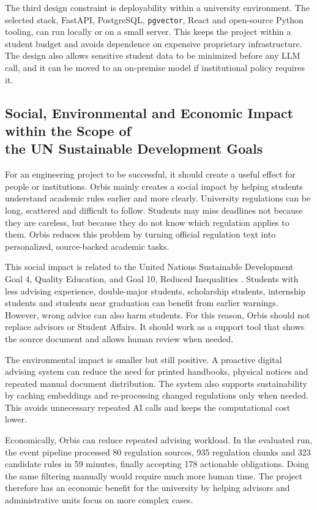 \documentclass[a4paper,12pt]{article}
\begin{document}
The third design constraint is deployability within a university environment. The selected stack, FastAPI, PostgreSQL, \texttt{pgvector}, React and open-source Python tooling, can run locally or on a small server. This keeps the project within a student budget and avoids dependence on expensive proprietary infrastructure. The design also allows sensitive student data to be minimized before any LLM call, and it can be moved to an on-premise model if institutional policy requires it.

\subsection[Social, Environmental and Economic Impact within the Scope of the UN Sustainable Development Goals]{Social, Environmental and Economic Impact within the Scope of\\ the UN Sustainable Development Goals}
For an engineering project to be successful, it should create a useful effect for people or institutions. Orbis mainly creates a social impact by helping students understand academic rules earlier and more clearly. University regulations can be long, scattered and difficult to follow. Students may miss deadlines not because they are careless, but because they do not know which regulation applies to them. Orbis reduces this problem by turning official regulation text into personalized, source-backed academic tasks.

This social impact is related to the United Nations Sustainable Development Goal 4, Quality Education, and Goal 10, Reduced Inequalities \cite{unSdgs}. Students with less advising experience, double-major students, scholarship students, internship students and students near graduation can benefit from earlier warnings. However, wrong advice can also harm students. For this reason, Orbis should not replace advisors or Student Affairs. It should work as a support tool that shows the source document and allows human review when needed.

The environmental impact is smaller but still positive. A proactive digital advising system can reduce the need for printed handbooks, physical notices and repeated manual document distribution. The system also supports sustainability by caching embeddings and re-processing changed regulations only when needed. This avoids unnecessary repeated AI calls and keeps the computational cost lower.

Economically, Orbis can reduce repeated advising workload. In the evaluated run, the event pipeline processed 80 regulation sources, 935 regulation chunks and 323 candidate rules in 59 minutes, finally accepting 178 actionable obligations. Doing the same filtering manually would require much more human time. The project therefore has an economic benefit for the university by helping advisors and administrative units focus on more complex cases.
\end{document}
